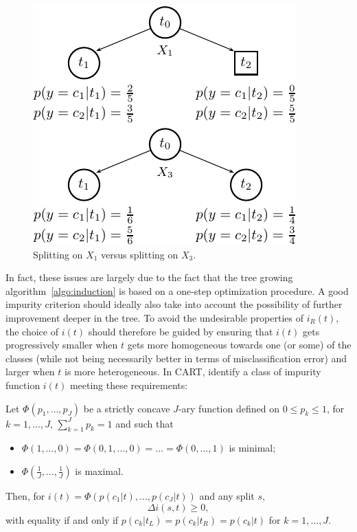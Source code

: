 \begin{figure}[h]
    \centering
    \includegraphics[scale=1.0]{figures/ch3_goodness.pdf}
    \caption{Splitting on $X_1$ versus splitting on $X_3$.}
    \label{fig:3:goodness}
\end{figure}

In fact, these issues are largely due to the fact that the tree growing
algorithm~\ref{algo:induction} is based on a one-step optimization procedure. A
good impurity criterion should ideally also take into account the possibility
of further improvement deeper in the tree. To avoid the undesirable properties
of $i_R(t)$, the choice of $i(t)$ should therefore be
guided by ensuring that $i(t)$ gets progressively smaller when $t$ gets more
homogeneous towards one (or some) of the classes (while not being necessarily
better in terms of misclassification error) and larger when $t$ is more
heterogeneous. In CART, \citet{breiman:1984} identify a class of impurity
function $i(t)$ meeting these requirements:

\begin{theorem}\label{thm:reduction-impurity}
Let $\Phi(p_1, \dots, p_J)$ be a strictly concave $J$-ary function defined
on $0 \leq p_k \leq 1$, for $k=1,\dots,J$, $\sum_{k=1}^J p_k = 1$ and such that
\begin{itemize}
\item $\Phi(1, \dots, 0) = \Phi(0, 1, \dots, 0) = \dots = \Phi(0, \dots, 1)$ is minimal;
\item $\Phi(\frac{1}{J}, \dots, \frac{1}{J})$ is maximal.
\end{itemize}
Then, for $i(t) = \Phi(p(c_1|t), \dots, p(c_J|t))$ and any split $s$, $$\Delta i(s, t) \geq 0,$$
with equality if and only if $p(c_k|t_L)=p(c_k|t_R)=p(c_k|t)$ for $k=1,\dots,J$.
\end{theorem}

